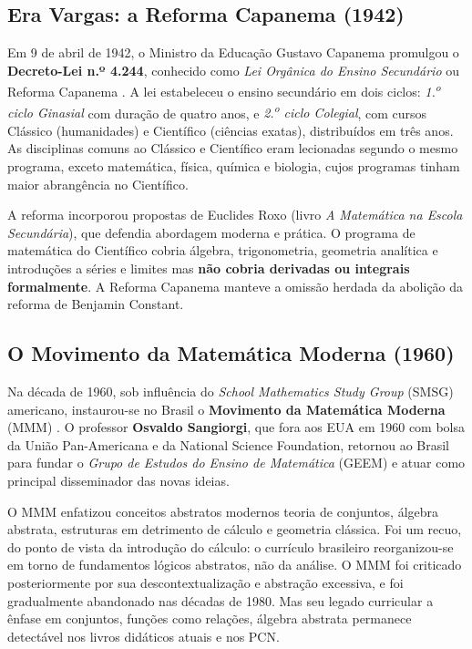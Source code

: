 \documentclass[12pt,a4paper,oneside]{article}
\begin{document}
\subsection{Era Vargas: a Reforma Capanema (1942)}

Em 9 de abril de 1942, o Ministro da Educação Gustavo Capanema
promulgou o \textbf{Decreto-Lei n.º 4.244}, conhecido como
\emph{Lei Orgânica do Ensino Secundário} ou Reforma Capanema
\cite{ref:capanema-decreto}. A lei estabeleceu o ensino secundário
em dois ciclos: \emph{1.\textsuperscript{o} ciclo Ginasial} com
duração de quatro anos, e \emph{2.\textsuperscript{o} ciclo
Colegial}, com cursos Clássico (humanidades) e Científico (ciências
exatas), distribuídos em três anos. As disciplinas comuns ao
Clássico e Científico eram lecionadas segundo o mesmo programa,
exceto matemática, física, química e biologia, cujos programas
tinham maior abrangência no Científico.

A reforma incorporou propostas de Euclides Roxo (livro
\emph{A Matemática na Escola Secundária}), que defendia abordagem
moderna e prática. O programa de matemática do Científico cobria
álgebra, trigonometria, geometria analítica e introduções a séries
e limites \textemdash{} mas \textbf{não cobria derivadas ou
integrais formalmente}. A Reforma Capanema manteve a omissão
herdada da abolição da reforma de Benjamin Constant.

\subsection{O Movimento da Matemática Moderna (1960)}

Na década de 1960, sob influência do \emph{School Mathematics
Study Group} (SMSG) americano, instaurou-se no Brasil o
\textbf{Movimento da Matemática Moderna} (MMM)
\cite{ref:mmm-bocehm,ref:mmm-burigo}. O professor \textbf{Osvaldo
Sangiorgi}, que fora aos EUA em 1960 com bolsa da União
Pan-Americana e da National Science Foundation, retornou ao Brasil
para fundar o \emph{Grupo de Estudos do Ensino de Matemática}
(GEEM) e atuar como principal disseminador das novas ideias.

O MMM enfatizou conceitos abstratos modernos \textemdash{} teoria
de conjuntos, álgebra abstrata, estruturas \textemdash{} em
detrimento de cálculo e geometria clássica. Foi um recuo, do ponto
de vista da introdução do cálculo: o currículo brasileiro
reorganizou-se em torno de fundamentos lógicos abstratos, não da
análise. O MMM foi criticado posteriormente por sua
descontextualização e abstração excessiva, e foi gradualmente
abandonado nas décadas de 1980. Mas seu legado
curricular \textemdash{} a ênfase em conjuntos, funções como
relações, álgebra abstrata \textemdash{} permanece detectável nos
livros didáticos atuais e nos PCN.
\end{document}
